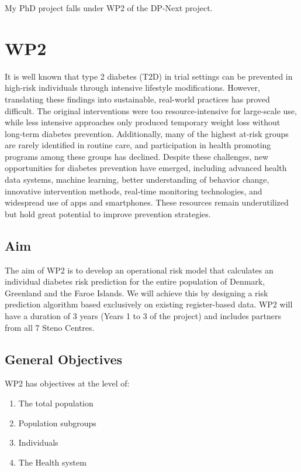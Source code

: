 \documentclass[11pt]{article}
\begin{document}
My PhD project falls under WP2 of the DP-Next project.

\section{WP2}
\label{sec:orgcd6624e}
It is well known that type 2 diabetes (T2D) in trial settings can be prevented in high-risk individuals
through intensive lifestyle modifications. However, translating these findings into sustainable,
real-world practices has proved difficult. The original interventions were too resource-intensive for
large-scale use, while less intensive approaches only produced temporary weight loss without long-term
diabetes prevention. Additionally, many of the highest at-risk groups are rarely identified in routine
care, and participation in health promoting programs among these groups has declined. Despite these
challenges, new opportunities for diabetes prevention have emerged, including advanced health data
systems, machine learning, better understanding of behavior change, innovative intervention methods,
real-time monitoring technologies, and widespread use of apps and smartphones. These resources remain
underutilized but hold great potential to improve prevention strategies.

\subsection{Aim}
\label{sec:org8c4862b}
The aim of WP2 is to develop an operational risk model that calculates an individual diabetes risk
prediction for the entire population of Denmark, Greenland and the Faroe Islands. We will achieve this
by designing a risk prediction algorithm based exclusively on existing register-based data. WP2 will
have a duration of 3 years (Years 1 to 3 of the project) and includes partners from all 7 Steno Centres.

\subsection{General Objectives}
\label{sec:orge70e2a7}
WP2 has objectives at the level of:
\begin{enumerate}
\item The total population
\item Population subgroups
\item Individuals
\item The Health system
\end{enumerate}
\end{document}
